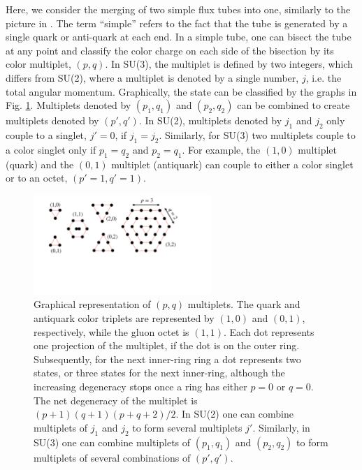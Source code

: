 \documentclass[aps, prc, 12pt, nofootinbib, showpacs, superscriptaddress, tightenlines, groupedaddress]{revtex4-2}
\begin{document}
Here, we consider the merging of two simple flux tubes into one, similarly to the picture in \cite{Vance:1997th}. The term ``simple'' refers to the fact that the tube is generated by a single quark or anti-quark at each end. In a simple tube, one can bisect the tube at any point and classify the color charge on each side of the bisection by its color multiplet, $(p,q)$. In SU(3), the multiplet is defined by two integers, which differs from SU(2), where a multiplet is denoted by a single number, $j$, i.e. the total angular momentum. Graphically, the state can be classified by the graphs in Fig. \ref{fig:pqmultiplet}. Multiplets denoted by $(p_1,q_1)$ and $(p_2,q_2)$ can be combined to create multiplets denoted by $(p',q')$. In SU(2), multiplets denoted by $j_1$ and $j_2$ only couple to a singlet, $j'=0$, if $j_1=j_2$. Similarly, for SU(3) two multiplets couple to a color singlet only if $p_1=q_2$ and $p_2=q_1$. For example, the $(1,0)$ multiplet (quark) and the $(0,1)$ multiplet (antiquark) can couple to either a color singlet or to an octet, $(p'=1,q'=1)$.
\begin{figure}
\centerline{\includegraphics[width=0.6\textwidth]{figs/pqmultiplet.pdf}}
\caption{\label{fig:pqmultiplet}
Graphical representation of $(p,q)$ multiplets. The quark and antiquark color triplets are represented by $(1,0)$ and $(0,1)$, respectively, while the gluon octet is $(1,1)$. Each dot represents one projection of the multiplet, if the dot is on the outer ring. Subsequently, for the next inner-ring ring a dot represents two states, or three states for the next inner-ring, although the increasing degeneracy stops once a ring has either $p=0$ or $q=0$. The net degeneracy of the multiplet is $(p+1)(q+1)(p+q+2)/2$. In SU(2) one can combine multiplets of $j_1$ and $j_2$ to form several multiplets $j'$. Similarly, in SU(3) one can combine multiplets of $(p_1,q_1)$ and $(p_2,q_2)$ to form multiplets of several combinations of $(p',q')$.
}
\end{figure}
\end{document}
